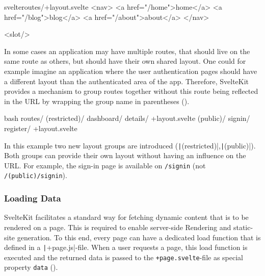 \begin{listing}[h!]
\begin{myminted}{svelte}{routes/+layout.svelte}
<nav>
  <a href="/home">home</a>
  <a href="/blog">blog</a>
  <a href="/about">about</a>
</nav>

<slot/>
\end{myminted}
\caption{Example for a layout that provides a navigation bar.}
\label{fig:sveltekit-layout}
\end{listing}

In some cases an application may have multiple routes, that should live on the same route as others, but should have their own shared layout. One could for example imagine an application where the user authentication pages should have a different layout than the authenticated area of the app. Therefore, SvelteKit provides a mechanism to group routes together without this route being reflected in the URL by wrapping the group name in parentheses ().

\begin{listing}[h!]
\begin{myminted}[highlightlines={2,6}]{bash}{}
routes/
  (restricted)/
    dashboard/
    details/
    +layout.svelte
  (public)/
    signin/
    register/
    +layout.svelte
\end{myminted}
\caption{Usage of layout groups to provide different layouts for public and restricted routes of an application.}
\label{fig:sveltekit-layout-groups}
\end{listing}

In this example two new layout groups are introduced (\texttt|(restricted)|,\texttt|(public)|). Both groups can provide their own layout without having an influence on the URL. For example, the sign-in page is available on \texttt{/signin} (not \texttt{/(public)/signin}).

\subsubsection{Loading Data}
\label{sec:sveltekit-loading}

SvelteKit facilitates a standard way for fetching dynamic content that is to be rendered on a page. This is required to enable server-side Rendering and static-site generation. To this end, every page can have a dedicated load function that is defined in a \texttt|+page.js|-file. When a user requests a page, this load function is executed and the returned data is passed to the \texttt{+page.svelte}-file as special property \texttt{data} ().

